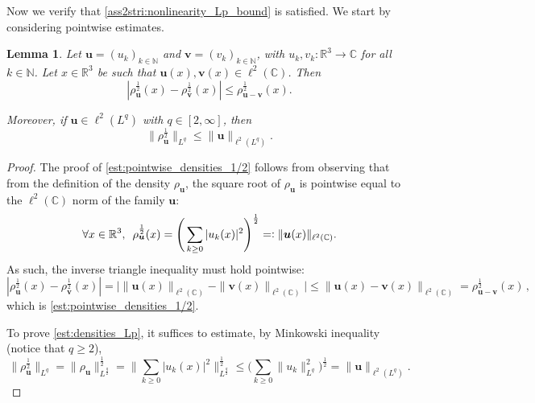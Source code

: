 \documentclass[12pt,a4paper]{amsart}
\newtheorem{lemma}[theorem]{Lemma}
\numberwithin{equation}{section}
\newcommand{\ulu}{\boldsymbol{u}}
\newcommand{\ulv}{\boldsymbol{v}}
\begin{document}
	Now we verify that \ref{ass2stri:nonlinearity_Lp_bound} is satisfied. We start by considering pointwise estimates.
	\begin{lemma}
		Let $ \ulu = (u_k)_{k\in\mathbb{N}} $ and $ \ulv = (v_k)_{k\in\mathbb{N}} $, with $u_k,v_k:\mathbb{R}^3\to\mathbb{C}$ for all $k\in\mathbb{N}$. Let $x\in\mathbb{R}^3$ be such that $\ulu(x),\ulv(x)\in\ell^2(\mathbb{C})$. Then
		\begin{equation}
			\label{est:pointwise_densities_1/2}
			| \rho_{\ulu }^{\frac{1}{2}} (x) - \rho_{\ulv }^{\frac{1}{2}} (x) | \leq \rho_{\ulu -\ulv }^{\frac{1}{2}}(x).
		\end{equation}
		
		Moreover, if  $ \ulu \in \ell^2 (L^q) $ with $ q \in [2,\infty] $, then
		\begin{equation}
			\label{est:densities_Lp}
			\| \rho_{\ulu }^{\frac{1}{2}}  \|_{L^q} \leq \| \ulu  \|_{\ell^2(L^q)} .
		\end{equation}
	\end{lemma}
	\begin{proof}
		The proof of \eqref{est:pointwise_densities_1/2} follows from observing that from the definition of the density $\rho_{\ulu }$, the square root of $\rho_{\ulu }$ is pointwise equal to the $ \ell^2 (\mathbb{C}) $ norm of the family $ \ulu  $:
		\begin{equation*}
			\forall x \in \mathbb{R}^3, \,\ \rho_{\ulu }^{\frac{1}{2}}(x) = \Bigg( \sum_{k \geq 0 }  |u_k(x)|^2 \Bigg)^{\frac{1}{2}} = \vcentcolon \| \ulu (x) \|_{ \ell^2 (\mathbb{C})}.
		\end{equation*}
		As such, the inverse triangle inequality must hold pointwise:
		\begin{equation*}
			| \rho_{\ulu }^{\frac{1}{2}} (x) - \rho_{\ulv }^{\frac{1}{2}} (x) |  = 	\big| \| \ulu (x) \|_{ \ell^2 (\mathbb{C})} - \| \ulv (x) \|_{ \ell^2 (\mathbb{C})} \big| \leq \| \ulu (x) - \ulv (x) \|_{ \ell^2(\mathbb{C})} = \rho_{\ulu -\ulv }^{\frac{1}{2}}(x)  \,,
		\end{equation*}
		which is \eqref{est:pointwise_densities_1/2}.
		
		To prove \eqref{est:densities_Lp},	it suffices to estimate, by Minkowski inequality (notice that $ q \geq 2$),
		\begin{equation*}
			\| \rho_{\ulu }^{\frac{1}{2}} \|_{L^q} = \| \rho_{\ulu } \|_{L^{\frac{q}{2}}}^{\frac{1}{2}} = \Big\| \sum_{k \geq 0}  |u_k(x) |^2  \Big\|_{L^{\frac{q}{2}}}^{\frac{1}{2}} \leq \Big( \sum_{k \geq 0}  \| u_k \|_{L^{q}}^2 \Big)^{\frac{1}{2}} = \|\ulu  \|_{\ell^2 (L^q) } .
		\end{equation*}
		
	\end{proof}
	
\end{document}
